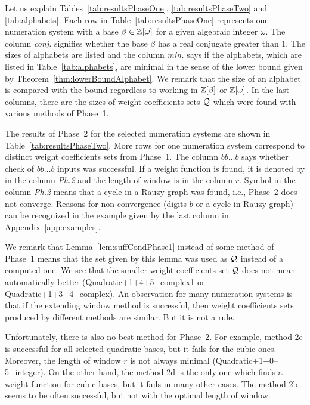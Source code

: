 Let us explain Tables~\ref{tab:resultsPhaseOne}, \ref{tab:resultsPhaseTwo} and \ref{tab:alphabets}. Each row in Table~\ref{tab:resultsPhaseOne} represents one numeration system with a base $\beta\in\mathbb{Z}[\omega]$ for a given algebraic integer $\omega$. The column \emph{conj.} signifies whether the base $\beta$ has a real conjugate greater than 1. The sizes of alphabets are listed and the column \emph{min.} says if the alphabets, which are listed in Table~\ref{tab:alphabets}, are minimal in the sense of the lower bound given by Theorem~\ref{thm:lowerBoundAlphabet}.  We remark that the size of an alphabet is compared with the bound regardless to working in $\mathbb{Z}[\beta]$ or $\mathbb{Z}[\omega]$. 
In the last columns, there are the sizes of weight coefficients sets $\mathcal{Q}$ which were found  with various methods of Phase~1.

The results of Phase~2 for the selected numeration systems are shown in Table~\ref{tab:resultsPhaseTwo}. More rows for one numeration system correspond to distinct weight coefficients sets from Phase~1. The column $bb\dots b$ says whether check of $bb\dots b$ inputs was successful. If a weight function is found, it is denoted by \checkmark{} in the column \emph{Ph.2} and the length of window is in the column $r$. Symbol \xmark{} in the column \emph{Ph.2} means that a cycle in a Rauzy graph was found, i.e., Phase~2 does not converge. Reasons for non-convergence (digits $b$ or a cycle in Rauzy graph) can be recognized in the  example given by the last column in Appendix~\ref{app:examples}.

We remark that Lemma~\ref{lem:suffCondPhase1} instead of some method of Phase~1 means that the set given by this lemma was used as $\mathcal{Q}$ instead of a computed one.  We see that the smaller weight coefficients set $\mathcal{Q}$ does not mean automatically better (Quadratic+1+4+5\_complex1 or Quadratic+1+3+4\_complex). An observation for many numeration systems is that if the extending window method is successful, then weight coefficients sets produced by different methods are similar. But it is not a rule. 

Unfortunately, there is also no best method for Phase~2. For example, method 2e is successful for all selected quadratic bases, but it fails for the cubic ones. Moreover, the length of window $r$ is not always minimal (Quadratic+1+0--5\_integer). On the other hand, the method 2d is the only one which finds a weight function for cubic bases, but it fails in many other cases. The method 2b seems to be often successful, but not with the optimal length of window.

